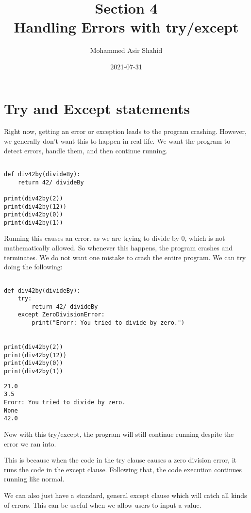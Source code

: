 \documentclass[11pt]{article}
\author{Mohammed Asir Shahid}
\date{2021-07-31}
\title{Section 4\\\medskip
\large Handling Errors with try/except}
\begin{document}
\maketitle
\tableofcontents


\section{Try and Except statements}
\label{sec:org4e23b3a}

Right now, getting an error or exception leads to the program crashing. However, we generally don't want this to happen in real life. We want the program to detect errors, handle them, and then continue running.



\begin{verbatim}

def div42by(divideBy):
    return 42/ divideBy

print(div42by(2))
print(div42by(12))
print(div42by(0))
print(div42by(1))

\end{verbatim}

Running this causes an error. as we are trying to divide by 0, which is not mathematically allowed. So whenever this happens, the program crashes and terminates. We do not want one mistake to crash the entire program. We can try doing the following:


\begin{verbatim}

def div42by(divideBy):
    try:
        return 42/ divideBy
    except ZeroDivisionError:
        print("Erorr: You tried to divide by zero.")


print(div42by(2))
print(div42by(12))
print(div42by(0))
print(div42by(1))

\end{verbatim}

\begin{verbatim}
21.0
3.5
Erorr: You tried to divide by zero.
None
42.0
\end{verbatim}


Now with this try/except, the program will still continue running despite the error we ran into.

This is because when the code in the try clause causes a zero division error, it runs the code in the except clause. Following that, the code execution continues running like normal.

We can also just have a standard, general except clause which will catch all kinds of errors. This can be useful when we allow users to input a value.
\end{document}
